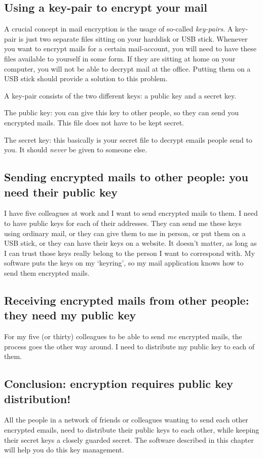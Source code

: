 \subsection{Using a key-pair to encrypt your mail}

A crucial concept in mail encryption is the usage of so-called
\emph{key-pairs}. A key-pair is just two separate files sitting on your
harddisk or USB stick. Whenever you want to encrypt mails for a certain
mail-account, you will need to have these files available to yourself in
some form. If they are sitting at home on your computer, you will not be
able to decrypt mail at the office. Putting them on a USB stick should
provide a solution to this problem.

A key-pair consists of the two different keys: a public key and a secret
key.

The public key: you can give this key to other people, so they can send
you encrypted mails. This file does not have to be kept secret.

The secret key: this basically is your secret file to decrypt emails
people send to you. It should \emph{never} be given to someone else.

\subsection{Sending encrypted mails to other people: you need their
public key}

I have five colleagues at work and I want to send encrypted mails to
them. I need to have public keys for each of their addresses. They can
send me these keys using ordinary mail, or they can give them to me in
person, or put them on a USB stick, or they can have their keys on a
website. It doesn't matter, as long as I can trust those keys really
belong to the person I want to correspond with. My software puts the
keys on my `keyring', so my mail application knows how to send them
encrypted mails.

\subsection{Receiving encrypted mails from other people: they need my
public key}

For my five (or thirty) colleagues to be able to send \emph{me}
encrypted mails, the process goes the other way around. I need to
distribute my public key to each of them.

\subsection{Conclusion: encryption requires public key distribution!}

All the people in a network of friends or colleagues wanting to send
each other encrypted emails, need to distribute their public keys to
each other, while keeping their secret keys a closely guarded secret.
The software described in this chapter will help you do this key
management.

